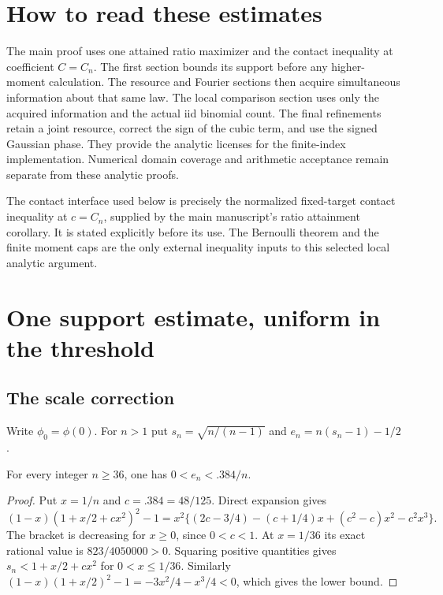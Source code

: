 \providecommand{\phio}{\phi(0)}
\providecommand{\cR}{\mathcal R}
\providecommand{\Prb}{\mathbb P}
\section*{How to read these estimates}
The main proof uses one attained ratio maximizer and the contact inequality
at coefficient $C=C_n$. The first section bounds its support before any
higher-moment calculation. The resource and Fourier sections then acquire
simultaneous information about that same law. The local comparison section
uses only the acquired information and the actual iid binomial count.
The final refinements retain a joint resource, correct the sign of the cubic
term, and use the signed Gaussian phase. They provide the analytic licenses
for the finite-index implementation. Numerical domain coverage and arithmetic
acceptance remain separate from these analytic proofs.

The contact interface used below is precisely the normalized fixed-target
contact inequality at $c=C_n$, supplied by the main manuscript's ratio
attainment corollary. It is stated explicitly before its use. The Bernoulli
theorem and the finite moment caps are the only external inequality inputs
to this selected local analytic argument.


\section{One support estimate, uniform in the threshold}\label{support:theorem}
\subsection{The scale correction}
Write $\phi_0=\phi(0)$.
For $n>1$ put $s_n=\sqrt{n/(n-1)}$ and
$e_n=n(s_n-1)-1/2$.
\begin{lemma}\label{support:scale}
For every integer $n\ge36$, one has $0<e_n<.384/n$.
\end{lemma}
\begin{proof}
Put $x=1/n$ and $c=.384=48/125$. Direct expansion gives
\[
 (1-x)(1+x/2+cx^2)^2-1
 =x^2\{(2c-3/4)-(c+1/4)x+(c^2-c)x^2-c^2x^3\}.
\]
The bracket is decreasing for $x\ge0$, since $0<c<1$.
At $x=1/36$ its exact rational value is $823/4050000>0$.
Squaring positive quantities gives
$s_n<1+x/2+cx^2$ for $0<x\le1/36$. Similarly
$(1-x)(1+x/2)^2-1=-3x^2/4-x^3/4<0$, which gives the lower bound.
\end{proof}


